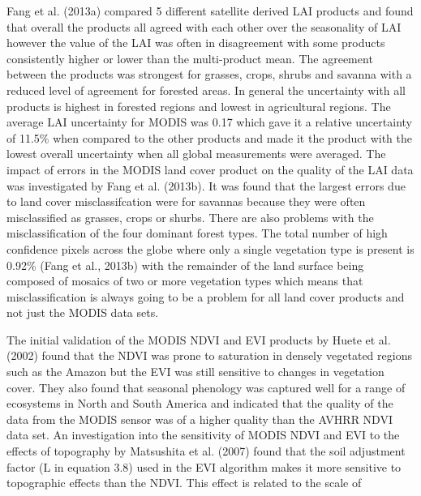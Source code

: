 Fang et al. (2013a) compared 5 different satellite derived LAI products and found that overall the products all agreed with each other over the seasonality of LAI however the value of the LAI was often in disagreement with some products consistently higher or lower than the multi-product mean. The agreement between the products was strongest for grasses, crops, shrubs and savanna with a reduced level of agreement for forested areas. In general the uncertainty with all products is highest in forested regions and lowest in agricultural regions. The average LAI uncertainty for MODIS was 0.17 which gave it a relative uncertainty of 11.5\% when compared
to the other products and made it the product with the lowest overall uncertainty when all global measurements were averaged. The impact of errors in the MODIS land cover product on the quality of the LAI data was investigated by Fang et al. (2013b). It was found that the largest errors due to land cover misclassifcation were for savannas because they were often misclassified as grasses, crops or shurbs. There are also problems with the misclassification of the four dominant forest types. The total number of high confidence pixels across the globe where only a single vegetation type is present is 0.92\% (Fang et al., 2013b) with the remainder of the land surface being composed of mosaics of two or more vegetation types which means that misclassification is always going to be a problem for all land cover products and not just the MODIS data sets.

The initial validation of the MODIS NDVI and EVI products by Huete et al. (2002) found that the NDVI was prone to saturation in densely vegetated regions such as the Amazon but the EVI was still sensitive to changes in vegetation cover. They also found that seasonal phenology was captured well for a range of ecosystems in North and South America and indicated that the quality of the data from the MODIS sensor was of a higher quality than the AVHRR NDVI data set. An investigation into the sensitivity of MODIS NDVI and EVI to the effects of topography by Matsushita et al. (2007) found that the soil adjustment factor (L in equation 3.8) used in the EVI algorithm makes it more sensitive to topographic effects than the NDVI. This effect is related to the scale of
